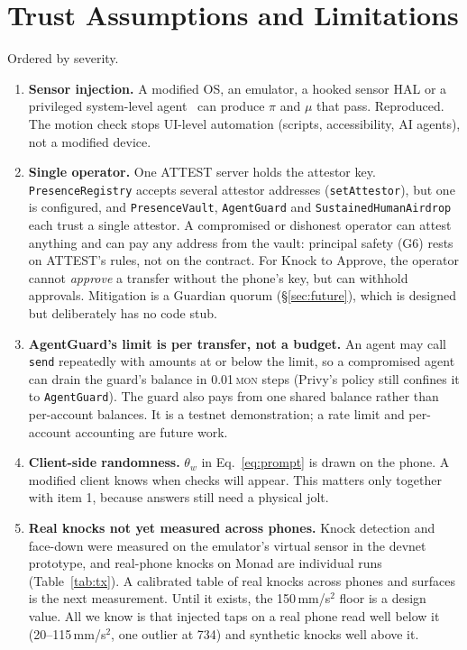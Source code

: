 \documentclass[10pt]{article}
\newcommand{\code}[1]{\texttt{\small #1}}
\newcommand{\mon}{\textsc{mon}}
\begin{document}
\section{Trust Assumptions and Limitations}\label{sec:limits}
Ordered by severity.
\begin{enumerate}
\item \textbf{Sensor injection.} A modified OS, an emulator, a hooked sensor HAL or a privileged system-level
agent~\cite{actreal2026} can produce $\pi$ and $\mu$ that pass. Reproduced. The motion check stops UI-level automation
(scripts, accessibility, AI agents), not a modified device.
\item \textbf{Single operator.} One ATTEST server holds the attestor key. \code{PresenceRegistry} accepts several
attestor addresses (\code{setAttestor}), but one is configured, and \code{PresenceVault}, \code{AgentGuard} and
\code{SustainedHumanAirdrop} each trust a single attestor. A compromised or dishonest operator can attest anything and
can pay any address from the vault: principal safety (G6) rests on ATTEST's rules, not on the contract. For Knock to
Approve, the operator cannot \emph{approve} a transfer without the phone's key, but can withhold approvals. Mitigation
is a Guardian quorum (\S\ref{sec:future}), which is designed but deliberately has no code stub.
\item \textbf{AgentGuard's limit is per transfer, not a budget.} An agent may call \code{send} repeatedly with amounts
at or below the limit, so a compromised agent can drain the guard's balance in 0.01\,\mon{} steps (Privy's policy still
confines it to \code{AgentGuard}). The guard also pays from one shared balance rather than per-account balances. It is a
testnet demonstration; a rate limit and per-account accounting are future work.
\item \textbf{Client-side randomness.} $\theta_w$ in Eq.~\eqref{eq:prompt} is drawn on the phone. A modified client knows
when checks will appear. This matters only together with item 1, because answers still need a physical jolt.
\item \textbf{Real knocks not yet measured across phones.} Knock detection and face-down were measured on the emulator's
virtual sensor in the devnet prototype, and real-phone knocks on Monad are individual runs (Table~\ref{tab:tx}). A
calibrated table of real knocks across phones and surfaces is the next measurement. Until it exists, the
150\,mm/s$^2$ floor is a design value. All we know is that injected taps on a real phone read well below it
(20--115\,mm/s$^2$, one outlier at 734) and synthetic knocks well above it.

\end{enumerate}
\end{document}
